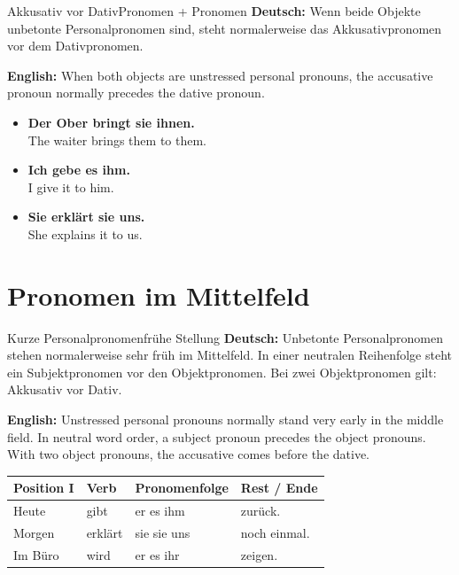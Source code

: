 \documentclass[a4paper,11pt]{article}
\newcommand{\GermanText}[1]{\textbf{Deutsch: }#1\par}
\newcommand{\EnglishText}[1]{{\small\color{SoftGray}\textbf{English: }#1\par}}
\newcommand{\ExampleItem}[2]{\item \textbf{#1}\\{\small\color{SoftGray}#2}}
\newcommand{\TableHeader}[1]{\color{white}\textbf{#1}}
\begin{document}
            \begin{grammarentry}{Akkusativ vor Dativ}{Pronomen + Pronomen}
                \GermanText{Wenn beide Objekte unbetonte Personalpronomen sind, steht normalerweise das Akkusativpronomen vor dem Dativpronomen.}
                \EnglishText{When both objects are unstressed personal pronouns, the accusative pronoun normally precedes the dative pronoun.}
            \end{grammarentry}
            
            \begin{exbox}
                \begin{itemize}
                    \ExampleItem{Der Ober bringt sie ihnen.}{The waiter brings them to them.}
                    \ExampleItem{Ich gebe es ihm.}{I give it to him.}
                    \ExampleItem{Sie erklärt sie uns.}{She explains it to us.}
                \end{itemize}
            \end{exbox}
    
    
    \section{Pronomen im Mittelfeld}
        
        \begin{grammarentry}{Kurze Personalpronomen}{frühe Stellung}
            \GermanText{Unbetonte Personalpronomen stehen normalerweise sehr früh im Mittelfeld. In einer neutralen Reihenfolge steht ein Subjektpronomen vor den Objektpronomen. Bei zwei Objektpronomen gilt: Akkusativ vor Dativ.}
            \EnglishText{Unstressed personal pronouns normally stand very early in the middle field. In neutral word order, a subject pronoun precedes the object pronouns. With two object pronouns, the accusative comes before the dative.}
        \end{grammarentry}
        
        \begin{longtable}{|p{3.3cm}|p{3.3cm}|p{3.3cm}|p{4.1cm}|}
            \hline
            \rowcolor{HeaderBlueDark}
            \TableHeader{Position I} & \TableHeader{Verb} & \TableHeader{Pronomenfolge} & \TableHeader{Rest / Ende} \\
            \hline
            Heute & gibt & er es ihm & zurück. \\
            \hline
            Morgen & erklärt & sie sie uns & noch einmal. \\
            \hline
            Im Büro & wird & er es ihr & zeigen. \\
            \hline
        \end{longtable}
    
\end{document}
